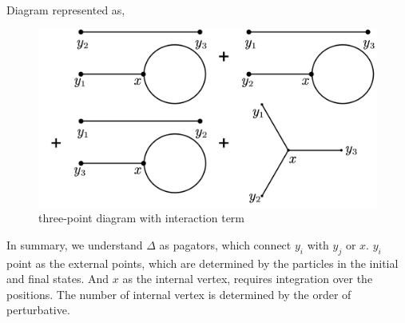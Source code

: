\documentclass[a4paper]{article}
\begin{document}
\par Diagram represented as,
\begin{figure}[H]
    \centering
    \includegraphics[width=0.8\linewidth]{3point.png}
    \caption{three-point diagram with interaction term}
    \label{fig:enter-label}
\end{figure}

\par In summary, we understand $\Delta$ as pagators, which connect $y_{i}$ with $y_{j}$ or $x$. $y_{i}$ point as the external points, which are determined by the particles in the initial and final states. And $x$ as the internal vertex, requires integration over the positions. The number of internal vertex is determined by the order of perturbative.
\end{document}
